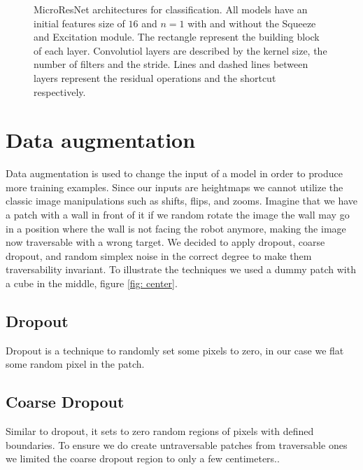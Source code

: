 \documentclass[../document.tex]{subfiles}
\begin{document}
\begin{figure}[htbp]
\begin{subfigure}[b]{0.22\textwidth}
        \caption{}
    \end{subfigure} 
    \caption{MicroResNet architectures for classification. All models have an initial features size of $16$ and $n=1$ with and without the Squeeze and Excitation module. The rectangle represent the building block of each layer. Convolutiol layers are described by the kernel size, the number of filters and the stride. Lines and dashed lines between layers represent the residual operations and the shortcut respectively.}
    \label{fig : microresnet}
\end{figure}

\section{Data augmentation}
\label{sec: data-aug}
Data augmentation is used to change the input of a model in order to produce more training examples. Since our inputs are heightmaps we cannot utilize the classic image manipulations such as shifts, flips, and zooms. Imagine that we have a patch with a wall in front of it if we random rotate the image the wall may go in a position where the wall is not facing the robot anymore, making the image now traversable with a wrong target. We decided to apply dropout, coarse dropout, and random simplex noise in the correct degree to make them traversability invariant. To illustrate the techniques we used a dummy patch with a cube in the middle, figure \ref{fig: center}.

\subsection{Dropout}
Dropout is a technique to randomly set some pixels to zero, in our case we flat some random pixel in the patch. 
\subsection{Coarse Dropout}
Similar to dropout, it sets to zero random regions of pixels with defined boundaries.  To ensure we do create untraversable patches from traversable ones we limited the coarse dropout region to only a few centimeters..
\end{document}
